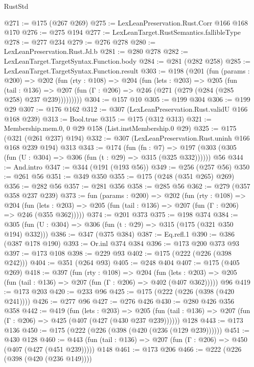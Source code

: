 \begin{lexlean}{RustStd}
\begin{coremodule}
@271 := @175 (@267 @269)
@275 := LexLeanPreservation.Rust.Corr @166 @168 @170
@276 := @275 @194
@277 := LexLeanTarget.RustSemantics.fallibleType
@278 := @277 @234
@279 := @276 @278
@280 := LexLeanPreservation.Rust.Jd.b
@281 := @280 @278
@282 := LexLeanTarget.TargetSyntax.Function.body
@284 := @281 (@282 @258)
@285 := LexLeanTarget.TargetSyntax.Function.result
@303 := @198
    (@201
      (fun (params : @200) =>
      @202
        (fun (rty : @108) =>
        @204
          (fun (lets : @203) =>
          @205
            (fun (tail : @136) =>
            @207 (fun (Γ : @206) => @246 (@271 (@279 (@284 (@285 @258) @237 @239)))))))))
@304 := @157 @10
@305 := @199 @304
@306 := @199 @29
@307 := @176 @162
@312 := @307 (LexLeanPreservation.Rust.validU @166 @168 @239)
@313 := Bool.true
@315 := @175 (@312 @313)
@321 := Membership.mem.{0, 0} @29 @158 (List.instMembership.{0} @29)
@325 := @175 (@321 (@261 @237) @194)
@332 := @307 (LexLeanPreservation.Rust.uninh @166 @168 @239 @194) @313
@343 := @174
    (fun (fn : @7) =>
    @197 (@303 (@305 (fun (U : @304) => @306 (fun (t : @29) => @315 (@325 @332))))))
    @56
@344 := And.intro
@347 := @344 (@191 (@193 @56))
@349 := @256 (@257 @56)
@350 := @261 @56
@351 := @349 @350
@355 := @175 (@248 (@351 @265) @269)
@356 := @282 @56
@357 := @281 @356
@358 := @285 @56
@362 := @279 (@357 @358 @237 @239)
@373 := fun (params : @200) =>
  @202
    (fun (rty : @108) =>
    @204
      (fun (lets : @203) => @205 (fun (tail : @136) => @207 (fun (Γ : @206) => @246 (@355 @362)))))
@374 := @201 @373
@375 := @198 @374
@384 := @305 (fun (U : @304) => @306 (fun (t : @29) => @315 (@175 (@321 @350 @194) @332)))
@386 := @347 (@375 @384)
@387 := Eq.refl.{1}
@390 := @386 (@387 @178 @190)
@393 := Or.inl @374 @384
@396 := @173 @200 @373 @93
@397 := @173 @108
@398 := @229 @93
@402 := @175 (@222 (@226 (@398 @242)))
@404 := @351 (@264 @93)
@405 := @248 @404
@407 := @175 (@405 @269)
@418 := @397
    (fun (rty : @108) =>
    @204
      (fun (lets : @203) => @205 (fun (tail : @136) => @207 (fun (Γ : @206) => @402 (@407 @362)))))
    @96
@419 := @173 @203
@420 := @233 @96
@425 := @175 (@222 (@226 (@398 (@420 @241))))
@426 := @277 @96
@427 := @276 @426
@430 := @280 @426 @356 @358
@442 := @419
    (fun (lets : @203) =>
    @205 (fun (tail : @136) => @207 (fun (Γ : @206) => @425 (@407 (@427 (@430 @237 @239))))))
    @128
@443 := @173 @136
@450 := @175 (@222 (@226 (@398 (@420 (@236 (@129 @239))))))
@451 := @430 @128
@460 := @443 (fun (tail : @136) => @207 (fun (Γ : @206) => @450 (@407 (@427 (@451 @239))))) @148
@461 := @173 @206
@466 := @222 (@226 (@398 (@420 (@236 @149))))

\end{coremodule}
\end{lexlean}
